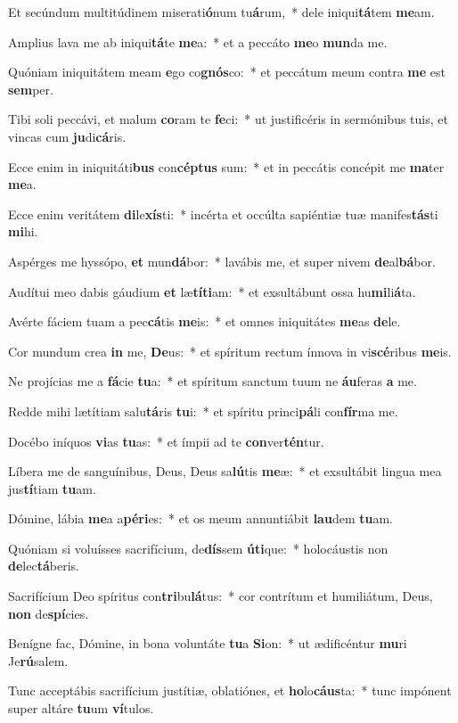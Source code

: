 \item Et secúndum multitúdinem miserati\textbf{ó}num tu\textbf{á}rum,~* dele iniqui\textbf{tá}tem \textbf{me}am.
\item Amplius lava me ab iniqui\textbf{tá}te \textbf{me}a:~* et a peccáto \textbf{me}o \textbf{mun}da me.
\item Quóniam iniquitátem meam \textbf{e}go co\textbf{gnós}co:~* et peccátum meum contra \textbf{me} est \textbf{sem}per.
\item Tibi soli peccávi, et malum \textbf{co}ram te \textbf{fe}ci:~* ut justificéris in sermónibus tuis, et vincas cum \textbf{ju}di\textbf{cá}ris.
\item Ecce enim in iniquitáti\textbf{bus} con\textbf{cép}\textbf{tus} sum:~* et in peccátis concépit me \textbf{ma}ter \textbf{me}a.
\item Ecce enim veritátem \textbf{di}le\textbf{xís}ti:~* incérta et occúlta sapiéntiæ tuæ manifes\textbf{tás}ti \textbf{mi}hi.
\item Aspérges me hyssópo, \textbf{et} mun\textbf{dá}bor:~* lavábis me, et super nivem \textbf{de}al\textbf{bá}bor.
\item Audítui meo dabis gáudium \textbf{et} læ\textbf{tí}\textbf{ti}am:~* et exsultábunt ossa hu\textbf{mi}li\textbf{á}ta.
\item Avérte fáciem tuam a pec\textbf{cá}tis \textbf{me}is:~* et omnes iniquitátes \textbf{me}as \textbf{de}le.
\item Cor mundum crea \textbf{in} me, \textbf{De}us:~* et spíritum rectum ínnova in vi\textbf{scé}ribus \textbf{me}is.
\item Ne projícias me a \textbf{fá}cie \textbf{tu}a:~* et spíritum sanctum tuum ne \textbf{áu}feras \textbf{a} me.
\item Redde mihi lætítiam salu\textbf{tá}ris \textbf{tu}i:~* et spíritu princi\textbf{pá}li con\textbf{fír}ma me.
\item Docébo iníquos \textbf{vi}as \textbf{tu}as:~* et ímpii ad te \textbf{con}ver\textbf{tén}tur.
\item Líbera me de sanguínibus, Deus, Deus sa\textbf{lú}tis \textbf{me}æ:~* et exsultábit lingua mea jus\textbf{tí}tiam \textbf{tu}am.
\item Dómine, lábia \textbf{me}a a\textbf{pé}\textbf{ri}es:~* et os meum annuntiábit \textbf{lau}dem \textbf{tu}am.
\item Quóniam si voluísses sacrifícium, de\textbf{dís}sem \textbf{ú}\textbf{ti}que:~* holocáustis non \textbf{de}lec\textbf{tá}beris.
\item Sacrifícium Deo spíritus con\textbf{tri}bu\textbf{lá}tus:~* cor contrítum et humiliátum, Deus, \textbf{non} de\textbf{spí}cies.
\item Benígne fac, Dómine, in bona voluntáte \textbf{tu}a \textbf{Si}on:~* ut ædificéntur \textbf{mu}ri Je\textbf{rú}salem.
\item Tunc acceptábis sacrifícium justítiæ, oblatiónes, et \textbf{ho}lo\textbf{cáus}ta:~* tunc impónent super altáre \textbf{tu}um \textbf{ví}tulos.

